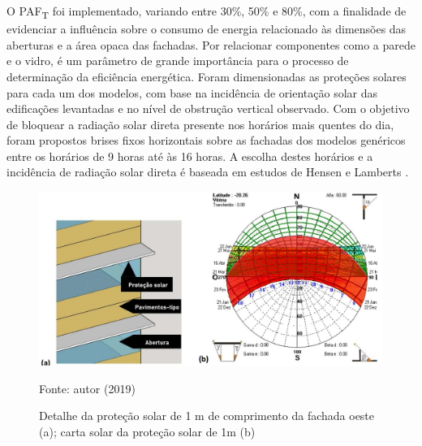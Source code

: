 \vspace{-0.3cm} \noindent O PAF\textsubscript{T} foi implementado, variando entre 30\%, 50\% e 80\%, com a finalidade de evidenciar a influência sobre o consumo de energia relacionado às dimensões das aberturas e a área opaca das fachadas. Por relacionar componentes como a parede e o vidro, é um parâmetro de grande importância para o processo de determinação da eficiência energética.
\noindent Foram dimensionadas as proteções solares para cada um dos modelos, com base na incidência de orientação solar das edificações levantadas e no nível de obstrução vertical observado. Com o objetivo de bloquear a radiação solar direta presente nos horários mais quentes do dia, foram propostos brises fixos horizontais sobre as fachadas dos modelos genéricos entre os horários de 9 horas até às 16 horas. A escolha destes horários e a incidência de radiação solar direta é baseada em estudos de Hensen e Lamberts \citeyear{Hensen2012}.
\begin{figure}[H]
    \centering
    \caption{Detalhe da proteção solar de 1 m de comprimento da fachada oeste (a); carta solar da proteção solar de 1m (b)}
    \includegraphics[width=1\textwidth]{figures/fig11-protecaosolar.jpg}
    \begin{flushleft}
        \par \small Fonte: autor (2019)
    \end{flushleft}
    \label{fig:figura12}
\end{figure}